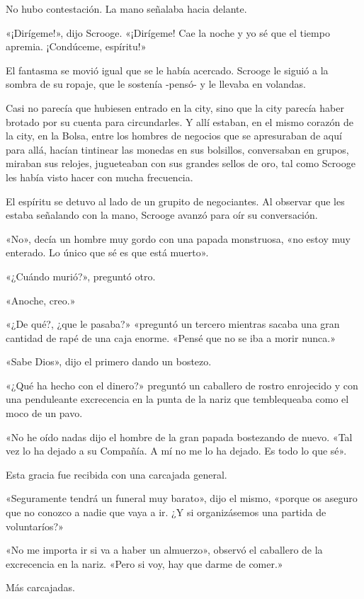 \documentclass{novela}
\begin{document}
 No hubo contestación. La mano señalaba hacia delante.

 «¡Dirígeme!», dijo Scrooge. «¡Dirígeme! Cae la noche y yo sé que el tiempo apremia. ¡Condúceme, espíritu!»

 El fantasma se movió igual que se le había acercado. Scrooge le siguió a la sombra de su ropaje, que le sostenía -pensó- y le llevaba en volandas.

 Casi no parecía que hubiesen entrado en la city, sino que la city parecía haber brotado por su cuenta para circundarles. Y allí estaban, en el mismo corazón de la city, en la Bolsa, entre los hombres de negocios que se apresuraban de aquí para allá, hacían tintinear las monedas en sus bolsillos, conversaban en grupos, miraban sus relojes, jugueteaban con sus grandes sellos de oro, tal como Scrooge les había visto hacer con mucha frecuencia.

 El espíritu se detuvo al lado de un grupito de negociantes. Al observar que les estaba señalando con la mano, Scrooge avanzó para oír su conversación.

 «No», decía un hombre muy gordo con una papada monstruosa, «no estoy muy enterado. Lo único que sé es que está muerto».

 «¿Cuándo murió?», preguntó otro.

 «Anoche, creo.»

 «¿De qué?, ¿que le pasaba?» «preguntó un tercero mientras sacaba una gran cantidad de rapé de una caja enorme. «Pensé que no se iba a morir nunca.»

 «Sabe Dios», dijo el primero dando un bostezo.

 «¿Qué ha hecho con el dinero?» preguntó un caballero de rostro enrojecido y con una penduleante excrecencia en la punta de la nariz que temblequeaba como el moco de un pavo.

 «No he oído nadas dijo el hombre de la gran papada bostezando de nuevo. «Tal vez lo ha dejado a su Compañía. A mí no me lo ha dejado. Es todo lo que sé».

 Esta gracia fue recibida con una carcajada general.

 «Seguramente tendrá un funeral muy barato», dijo el mismo, «porque os aseguro que no conozco a nadie que vaya a ir. ¿Y si organizásemos una partida de voluntaríos?»

 «No me importa ir si va a haber un almuerzo», observó el caballero de la excrecencia en la nariz. «Pero si voy, hay que darme de comer.»

 Más carcajadas.
\end{document}
